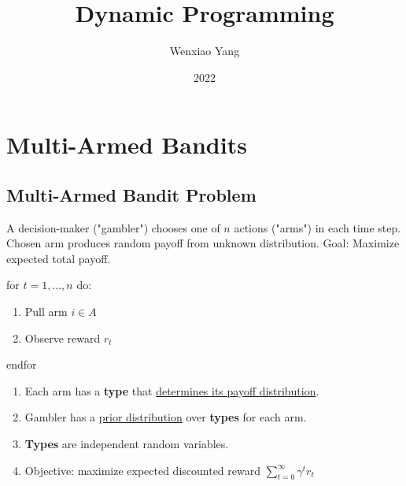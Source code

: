 \documentclass[11pt]{elegantbook}
\title{\textbf{Dynamic Programming}}
\author{Wenxiao Yang}
\institute{Department of Mathematics, University of Illinois at Urbana-Champaign}
\date{2022}
\begin{document}
\maketitle
\frontmatter
\tableofcontents
\mainmatter


\chapter{Multi-Armed Bandits}
\section{Multi-Armed Bandit Problem}
\begin{definition}
    A decision-maker ("gambler") chooses one of $n$ actions ("arms") in each time step. Chosen arm produces random payoff from unknown distribution. Goal: Maximize expected total payoff.
\end{definition}

for $t=1,...,n$ do:
\begin{enumerate}
    \item Pull arm $i\in A$
    \item Observe reward $r_t$
\end{enumerate}
endfor

\begin{claim}
    \begin{enumerate}[$\bullet$]
        \item Each arm has a \textbf{type} that \underline{determines its payoff distribution}.
        \item Gambler has a \underline{prior distribution} over \textbf{types} for each arm.
        \item \textbf{Types} are independent random variables.
        \item Objective: maximize expected discounted reward $\sum_{t=0}^\infty \gamma^t r_t$
    \end{enumerate}
\end{claim}
\end{document}
